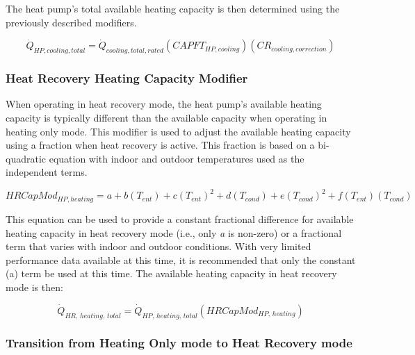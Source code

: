 The heat pump's total available heating capacity is then determined using the previously described modifiers.

\begin{equation}
  \dot{Q}_{HP,cooling,total} = \dot{Q}_{cooling,total,rated} \left( CAPFT_{HP,cooling} \right) \left( CR_{cooling,correction} \right)
\end{equation}

\subsubsection{Heat Recovery Heating Capacity Modifier}\label{heat-recovery-heating-capacity-modifier}

When operating in heat recovery mode, the heat pump's available heating capacity is typically different than the available capacity when operating in heating only mode. This modifier is used to adjust the available heating capacity using a fraction when heat recovery is active. This fraction is based on a bi-quadratic equation with indoor and outdoor temperatures used as the independent terms.

\begin{equation}
  HRCapMod_{HP,heating} = a + b \left( T_{ent} \right) + c \left( T_{ent} \right)^2 + d \left( T_{cond} \right) + e \left( T_{cond} \right)^2 + f \left( T_{ent} \right) \left( T_{cond} \right)
\end{equation}

This equation can be used to provide a constant fractional difference for available heating capacity in heat recovery mode (i.e., only \emph{a} is non-zero) or a fractional term that varies with indoor and outdoor conditions. With very limited performance data available at this time, it is recommended that only the constant (a) term be used at this time. The available heating capacity in heat recovery mode is then:

\begin{equation}
  \dot{Q}_{HR,\,heating,\,total} = \dot{Q}_{HP,\,heating,\,total} \left( HRCapMod_{HP,\,heating} \right)
\end{equation}

\subsubsection{Transition from Heating Only mode to Heat Recovery mode}\label{transition-from-heating-only-mode-to-heat-recovery-mode}

